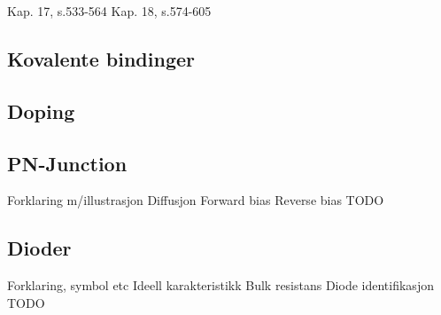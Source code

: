 Kap. 17, s.533-564
Kap. 18, s.574-605

\subsection{Kovalente bindinger}


\subsection{Doping}


\subsection{PN-Junction}
Forklaring m/illustrasjon
Diffusjon
Forward bias
Reverse bias
TODO

\subsection{Dioder}
Forklaring, symbol etc
Ideell karakteristikk
Bulk resistans
Diode identifikasjon
TODO
